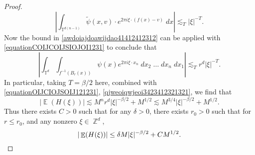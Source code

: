 \documentclass[dvipsnames,letterpaper,12pt]{article}
\numberwithin{equation}{section}
\DeclareMathOperator{\ZZ}{\mathbb{Z}}
\DeclareMathOperator{\TT}{\mathbb{T}}
\numberwithin{theorem}{section}
\DeclareMathOperator{\EE}{\mathbb{E}}
\begin{document}
\begin{proof}
    \begin{equation} \label{awdoiajdoawijdao41412412312}
        \left|\int_{\TT^{d(n-1)}} \tilde{\psi}(x,v) \cdot e^{2 \pi i \xi \cdot (f(x) - v)}\; dx \right| \lesssim_T |\xi|^{-T}.
    \end{equation}
    Now the bound in \eqref{awdoiajdoawijdao41412412312} can be applied with \eqref{equationCOIJCOIJSIOJOI1231} to conclude that
    \begin{equation} \label{qjweoiqwjeoi3423412321321}
        \left| \int_{\TT^d} \int_{f^{-1}(B_r(x))} \psi(x) e^{2 \pi i \xi \cdot x_n}\; dx_2\; \dots\; dx_n\; dx_1 \right| \lesssim_T r^d |\xi|^{-T}.
    \end{equation}
    In particular, taking $T = \beta/2$ here, combined with \eqref{equationOIJCIOJSOIJ121231}, \eqref{qjweoiqwjeoi3423412321321}, we find that
    \begin{equation}
        |\EE(H(\xi)) | \lesssim M^n r^d |\xi|^{-\beta/2} + M^{1/2} \lesssim M^{3/4} |\xi|^{-\beta/2} + M^{1/2}.
    \end{equation}
    Thus there exists $C > 0$ such that for any $\delta > 0$, there exists $r_0 > 0$ such that for $r \leq r_0$, and any nonzero $\xi \in \ZZ^d$,
    \[ |\EE(H(\xi))| \leq \delta M |\xi|^{-\beta/2} + CM^{1/2}. \qedhere \]

\end{proof}
\end{document}
